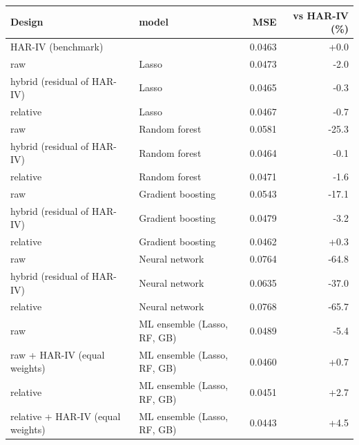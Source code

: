 \begin{tabular}{llrr}
\toprule
Design & model & MSE & vs HAR-IV (\%) \\
\midrule
HAR-IV (benchmark) &  & 0.0463 & +0.0 \\
raw & Lasso & 0.0473 & -2.0 \\
hybrid (residual of HAR-IV) & Lasso & 0.0465 & -0.3 \\
relative & Lasso & 0.0467 & -0.7 \\
raw & Random forest & 0.0581 & -25.3 \\
hybrid (residual of HAR-IV) & Random forest & 0.0464 & -0.1 \\
relative & Random forest & 0.0471 & -1.6 \\
raw & Gradient boosting & 0.0543 & -17.1 \\
hybrid (residual of HAR-IV) & Gradient boosting & 0.0479 & -3.2 \\
relative & Gradient boosting & 0.0462 & +0.3 \\
raw & Neural network & 0.0764 & -64.8 \\
hybrid (residual of HAR-IV) & Neural network & 0.0635 & -37.0 \\
relative & Neural network & 0.0768 & -65.7 \\
raw & ML ensemble (Lasso, RF, GB) & 0.0489 & -5.4 \\
raw + HAR-IV (equal weights) & ML ensemble (Lasso, RF, GB) & 0.0460 & +0.7 \\
relative & ML ensemble (Lasso, RF, GB) & 0.0451 & +2.7 \\
relative + HAR-IV (equal weights) & ML ensemble (Lasso, RF, GB) & 0.0443 & +4.5 \\
\bottomrule
\end{tabular}
